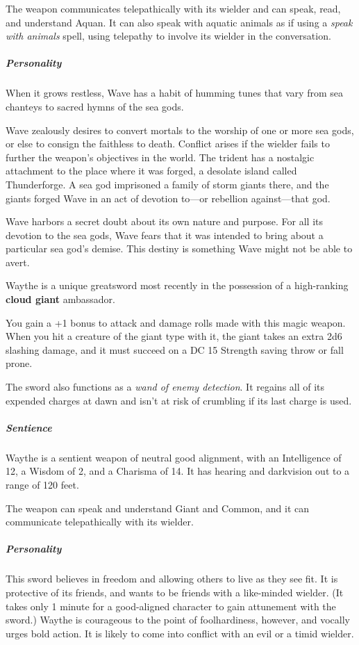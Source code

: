 \documentclass[10pt,a4paper,twoside,bg=print,twocolumn,openany,nodeprecatedcode]{dndbook}
\begin{document}
The weapon communicates telepathically with its wielder and can speak, read, and understand Aquan. It can also speak with aquatic animals as if using a \textit{speak with animals} spell, using telepathy to involve its wielder in the conversation.

\subparagraph{Personality}
When it grows restless, Wave has a habit of humming tunes that vary from sea chanteys to sacred hymns of the sea gods.

Wave zealously desires to convert mortals to the worship of one or more sea gods, or else to consign the faithless to death. Conflict arises if the wielder fails to further the weapon's objectives in the world. The trident has a nostalgic attachment to the place where it was forged, a desolate island called Thunderforge. A sea god imprisoned a family of storm giants there, and the giants forged Wave in an act of devotion to—or rebellion against—that god.

Wave harbors a secret doubt about its own nature and purpose. For all its devotion to the sea gods, Wave fears that it was intended to bring about a particular sea god's demise. This destiny is something Wave might not be able to avert.

Waythe is a unique greatsword most recently in the possession of a high-ranking \textbf{cloud giant} ambassador.

You gain a +1 bonus to attack and damage rolls made with this magic weapon. When you hit a creature of the giant type with it, the giant takes an extra 2d6 slashing damage, and it must succeed on a DC 15 Strength saving throw or fall prone.

The sword also functions as a \textit{wand of enemy detection}. It regains all of its expended charges at dawn and isn't at risk of crumbling if its last charge is used.

\subparagraph{Sentience}
Waythe is a sentient weapon of neutral good alignment, with an Intelligence of 12, a Wisdom of 2, and a Charisma of 14. It has hearing and darkvision out to a range of 120 feet.

The weapon can speak and understand Giant and Common, and it can communicate telepathically with its wielder.

\subparagraph{Personality}
This sword believes in freedom and allowing others to live as they see fit. It is protective of its friends, and wants to be friends with a like-minded wielder. (It takes only 1 minute for a good-aligned character to gain attunement with the sword.) Waythe is courageous to the point of foolhardiness, however, and vocally urges bold action. It is likely to come into conflict with an evil or a timid wielder.
\end{document}
